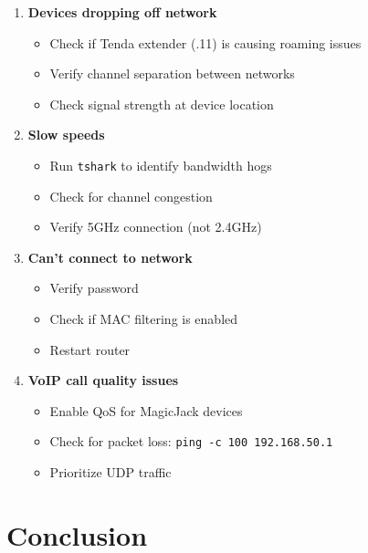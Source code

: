 \documentclass[11pt,letterpaper]{article}
\begin{document}
\begin{enumerate}
    \item \textbf{Devices dropping off network}
    \begin{itemize}
        \item Check if Tenda extender (.11) is causing roaming issues
        \item Verify channel separation between networks
        \item Check signal strength at device location
    \end{itemize}

    \item \textbf{Slow speeds}
    \begin{itemize}
        \item Run \texttt{tshark} to identify bandwidth hogs
        \item Check for channel congestion
        \item Verify 5GHz connection (not 2.4GHz)
    \end{itemize}

    \item \textbf{Can't connect to network}
    \begin{itemize}
        \item Verify password
        \item Check if MAC filtering is enabled
        \item Restart router
    \end{itemize}

    \item \textbf{VoIP call quality issues}
    \begin{itemize}
        \item Enable QoS for MagicJack devices
        \item Check for packet loss: \texttt{ping -c 100 192.168.50.1}
        \item Prioritize UDP traffic
    \end{itemize}
\end{enumerate}

\section{Conclusion}
\end{document}
